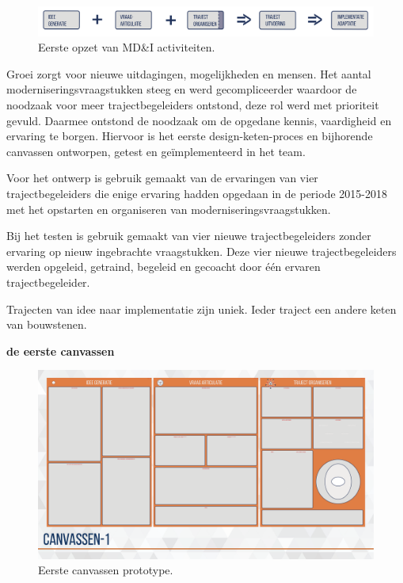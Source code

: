 \documentclass[
]{book}
\begin{document}
\begin{figure}
\includegraphics[width=122.31in]{data/images/20190710-CDE-designproces_bouwstenenKeten} \caption{Eerste opzet van MD\&I activiteiten.}\label{fig:unnamed-chunk-29}
\end{figure}

Groei zorgt voor nieuwe uitdagingen, mogelijkheden en mensen. Het aantal moderniseringsvraagstukken steeg en werd gecompliceerder waardoor de noodzaak voor meer trajectbegeleiders ontstond, deze rol werd met prioriteit gevuld. Daarmee ontstond de noodzaak om de opgedane kennis, vaardigheid en ervaring te borgen. Hiervoor is het eerste design-keten-proces en bijhorende canvassen ontworpen, getest en geïmplementeerd in het team.

Voor het ontwerp is gebruik gemaakt van de ervaringen van vier trajectbegeleiders die enige ervaring hadden opgedaan in de periode 2015-2018 met het opstarten en organiseren van moderniseringsvraagstukken.

Bij het testen is gebruik gemaakt van vier nieuwe trajectbegeleiders zonder ervaring op nieuw ingebrachte vraagstukken. Deze vier nieuwe trajectbegeleiders werden opgeleid, getraind, begeleid en gecoacht door één ervaren trajectbegeleider.

Trajecten van idee naar implementatie zijn uniek.
Ieder traject een andere keten van bouwstenen.

\textbf{de eerste canvassen}

\begin{figure}
\includegraphics[width=26.67in]{data/keynote-slides/20200430-CDE-Designprocess/20200430-CDE-Designprocess.023} \caption{Eerste canvassen prototype.}\label{fig:unnamed-chunk-30}
\end{figure}
\end{document}
